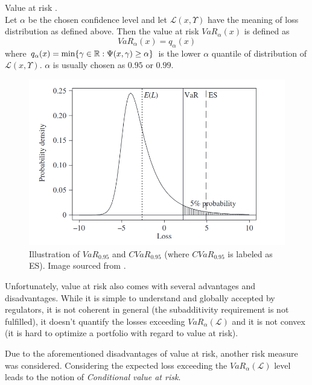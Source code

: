 \begin{defn}{Value at risk \cite[p. 275]{cornuejols_tutuncu_2006}.}  \\
Let $\alpha$ be the chosen confidence level and let $\mathcal{L}(x,\Upsilon)$ have the meaning of loss distribution as defined above. Then the value at risk $VaR_{\alpha}(x)$ is defined as
\begin{equation*}
VaR_{\alpha}(x)=q_{\alpha}(x)
\end{equation*}
where $q_{\alpha}(x)=\mathrm{min}\{\gamma \in \mathbb{R}: \Psi(x,\gamma) \geq \alpha \}$ is the lower $\alpha$ quantile of distribution of $\mathcal{L}(x,\Upsilon)$. $\alpha$ is usually chosen as $0.95$ or $0.99$.
\end{defn}

\begin{figure}
  \includegraphics[width=\linewidth]{../img/VaR_CVaR_graph_theory.png}
  \caption{Illustration of $VaR_{0.95}$ and $CVaR_{0.95}$ (where $CVaR_{0.95}$ is labeled as ES). Image sourced from \cite[Figure 2.2.]{mcneil2015quantitative}.}
  \label{fig:VaR_CVaR_graph_theory}
\end{figure}

Unfortunately, value at risk also comes with several advantages and disadvantages. While it is simple to understand and globally accepted by regulators, it is not coherent in general (the subadditivity requirement is not fulfilled), it doesn't quantify the losses exceeding $VaR_{\alpha}(\mathcal{L})$ and it is not convex (it is hard to optimize a portfolio with regard to value at risk). 

Due to the aforementioned disadvantages of value at risk, another risk measure was considered.
Considering the expected loss exceeding the $VaR_{\alpha}(\mathcal{L})$ level leads to the notion of \textit{Conditional value at risk}. 

